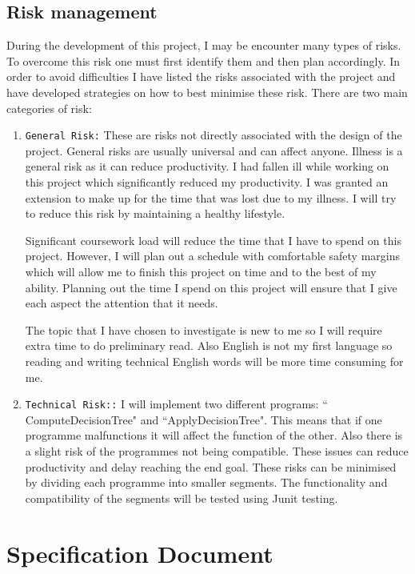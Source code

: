 \documentclass{report}
\begin{document}
\section{Risk management}
\label{sec:riskman}

During the development of this project, I may be encounter many types of risks. To overcome this risk one must first identify them and then plan accordingly.
In order to avoid difficulties I have listed the risks associated with the project and have developed strategies on how to best minimise these risk.
There are two main categories of risk:
\begin{enumerate}

\item \texttt{General Risk:} These are risks not directly associated with the design of the project. General risks are usually universal and can affect anyone. Illness is a general risk as it can reduce productivity. I had fallen ill while working on this project which significantly reduced my productivity. I was granted an extension to make up for the time that was lost due to my illness. I will try to reduce this risk by maintaining a healthy lifestyle.
 
Significant coursework load will reduce the time that I have to spend on this project. However, I will plan out a schedule with comfortable safety margins which will allow me to finish this project on time and to the best of my ability. Planning out the time I spend on this project will ensure that I give each aspect the attention that it needs.
 
The topic that I have chosen to investigate is new to me so I will require extra time to do preliminary read. Also English is not my first language so reading and writing technical English words will be more time consuming for me.
 
\item \texttt{Technical Risk::} I will implement two different programs: `` ComputeDecisionTree" and
``ApplyDecisionTree". This means that if one programme malfunctions it will affect the function of the other. Also there is a slight risk of the programmes not being compatible. These issues can reduce productivity and delay reaching the end goal. These risks can be minimised by dividing each programme into smaller segments. The functionality and compatibility of the segments will be tested using Junit testing.

\end{enumerate}

\chapter{Specification Document}
\label{cha:specdoc}
\end{document}
